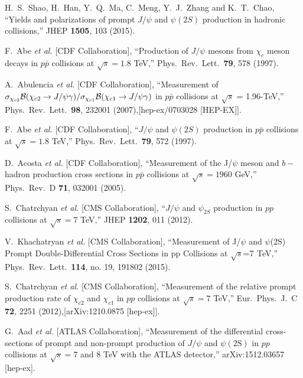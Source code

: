\documentclass[aps,prc,preprint,superscriptaddress,showpacs,showkeys,amsmath]{revtex4-1}
\begin{document}
\begin{thebibliography}{100}
  H.~S.~Shao, H.~Han, Y.~Q.~Ma, C.~Meng, Y.~J.~Zhang and K.~T.~Chao,
  ``Yields and polarizations of prompt $J/\psi$ and $\psi(2S)$ production in hadronic collisions,''
  JHEP {\bf 1505}, 103 (2015).




  F.~Abe {\it et al.} [CDF Collaboration],
  ``Production of $J/\psi$ mesons from $\chi_c$ meson decays in $p\bar{p}$ collisions at $\sqrt{s} = 1.8$ TeV,''
  Phys.\ Rev.\ Lett.\  {\bf 79}, 578 (1997).


  A.~Abulencia {\it et al.} [CDF Collaboration],
  ``Measurement of $\sigma_{\chi_{c2}}{\cal B}(\chi_{c2} \to J/\psi \gamma)/\sigma_{\chi_{c1}} {\cal B}(\chi_{c1} \to J/\psi \gamma)$ 
  in $p \bar{p}$ collisions at $\sqrt{s}$ = 1.96-TeV,''
  Phys.\ Rev.\ Lett.\  {\bf 98}, 232001 (2007),[hep-ex/0703028 [HEP-EX]].


  F.~Abe {\it et al.} [CDF Collaboration],
  ``$J/\psi$ and $\psi(2S)$ production in $p\bar{p}$ collisions at $\sqrt{s} = 1.8$ TeV,''
  Phys.\ Rev.\ Lett.\  {\bf 79}, 572 (1997).
  

  D.~Acosta {\it et al.}  [CDF Collaboration],
  ``Measurement of the J/$\psi$ meson and $b-$hadron production cross sections in $p\bar{p}$ collisions at $\sqrt{s} = 1960$ GeV,''
  Phys.\ Rev.\ D {\bf 71}, 032001 (2005).



  S.~Chatrchyan {\it et al.} [CMS Collaboration],
  ``$J/\psi$ and $\psi_{2S}$ production in $pp$ collisions at $\sqrt{s}=7$ TeV,''
  JHEP {\bf 1202}, 011 (2012).
  

  V.~Khachatryan {\it et al.} [CMS Collaboration],
  ``Measurement of J/$\psi$ and $\psi$(2S) Prompt Double-Differential Cross Sections in pp Collisions at $\sqrt{s}$=7  TeV,''
  Phys.\ Rev.\ Lett.\  {\bf 114}, no. 19, 191802 (2015).

  S.~Chatrchyan {\it et al.} [CMS Collaboration],
  ``Measurement of the relative prompt production rate of $\chi_{c2}$ and $\chi_{c1}$ 
  in $pp$ collisions at $\sqrt{s}=7$ TeV,''
  Eur.\ Phys.\ J.\ C {\bf 72}, 2251 (2012),[arXiv:1210.0875 [hep-ex]].


  G.~Aad {\it et al.} [ATLAS Collaboration],
  ``Measurement of the differential cross-sections of prompt and non-prompt production of $J/\psi$ 
  and $\psi(2\mathrm{S})$ in $pp$ collisions at $\sqrt{s} = 7$ and $8$ TeV with the ATLAS detector,''
  arXiv:1512.03657 [hep-ex].



\end{thebibliography}
\end{document}
